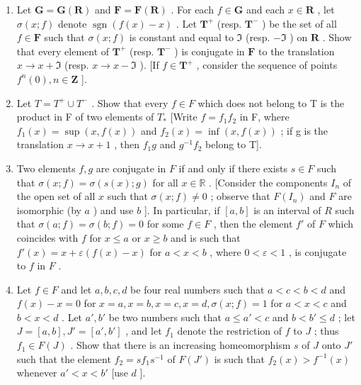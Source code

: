 \begin{enumerate}
\def\labelenumi{\alph{enumi})}
\setcounter{enumi}{1}
\item
  Let \(\mathbf{G} = \mathbf{G}(\mathbf{R})\) and \(\mathbf{F} = \mathbf{F}(\mathbf{R})\) . For each \(f \in \mathbf{G}\) and each \(x \in \mathbf{R}\) , let \(\sigma(x; f)\) denote \(\operatorname{sgn}(f(x) - x)\) . Let \(\mathbf{T}^{+}\) (resp. \(\mathbf{T}^{-}\) ) be the set of all \(f \in \mathbf{F}\) such that \(\sigma(x; f)\) is constant and equal to \(\mathfrak{I}\) (resp. \(-\mathfrak{I}\) ) on \(\mathbf{R}\) . Show that every element of \(\mathbf{T}^{+}\) (resp. \(\mathbf{T}^{-}\) ) is conjugate in \(\mathbf{F}\) to the translation \(x \to x + \mathfrak{I}\) (resp. \(x \to x - \mathfrak{I}\) ). {[}If \(f \in \mathbf{T}^{+}\) , consider the sequence of points \(f^{n}(0), n \in \mathbf{Z}\) {]}.
\item
  Let \(T = T^{+} \cup T^{-}\) . Show that every \(f \in F\) which does not belong to T is the product in F of two elements of \(T_{*}\) {[}Write \(f = f_{1}f_{2}\) in F, where \(f_{1}(x) = \sup (x, f(x))\) and \(f_{2}(x) = \inf (x, f(x))\) ; if g is the translation \(x \to x + 1\) , then \(f_{1}g\) and \(g^{-1}f_{2}\) belong to T{]}.
\item
  Two elements \(f, g\) are conjugate in \(F\) if and only if there exists \(s \in F\) such that \(\sigma(x; f) = \sigma(s(x); g)\) for all \(x \in \mathbb{R}\) . {[}Consider the components \(I_n\) of the open set of all \(x\) such that \(\sigma(x; f) \neq 0\) ; observe that \(F(I_n)\) and \(F\) are isomorphic (by \(a\) ) and use \(b\) {]}. In particular, if \([a, b]\) is an interval of \(R\) such that \(\sigma(a; f) = \sigma(b; f) = 0\) for some \(f \in F\) , then the element \(f'\) of \(F\) which coincides with \(f\) for \(x \leqslant a\) or \(x \geqslant b\) and is such that \(f'(x) = x + \varepsilon(f(x) - x)\) for \(a < x < b\) , where \(0 < \varepsilon < 1\) , is conjugate to \(f\) in \(F\) .
\item
  Let \(f \in F\) and let \(a, b, c, d\) be four real numbers such that \(a < c < b < d\) and \(f(x) - x = 0\) for \(x = a, x = b, x = c, x = d, \sigma(x; f) = 1\) for \(a < x < c\) and \(b < x < d\) . Let \(a', b'\) be two numbers such that \(a \leqslant a' < c\) and \(b < b' \leqslant d\) ; let \(J = [a, b], J' = [a', b']\) , and let \(f_1\) denote the restriction of \(f\) to \(J\) ; thus \(f_1 \in F(J)\) . Show that there is an increasing homeomorphism \(s\) of \(J\) onto \(J'\) such that the element \(f_2 = sf_1s^{-1}\) of \(F(J')\) is such that \(f_2(x) > f^{-1}(x)\) whenever \(a' < x < b'\) {[}use \(d\) {]}.
\end{enumerate}

